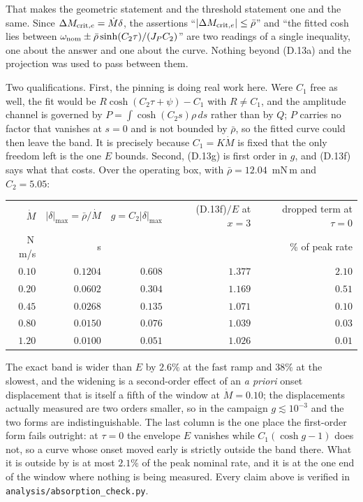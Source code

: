 \documentclass[11pt]{article}
\newcommand{\rbar}{\bar\rho}
\begin{document}
That makes the geometric statement and the threshold statement one and
the same. Since $\Delta M_{{\rm crit},e} = \dot M\delta$, the assertions
``$|\Delta M_{{\rm crit},e}| \le \rbar$'' and ``the fitted cosh lies
between $\omega_{\rm nom} \pm \rbar\sinh(C_2\tau)/(J_PC_2)$'' are two
readings of a single inequality, one about the answer and one about the
curve. Nothing beyond (D.13a) and the projection was used to pass
between them.

Two qualifications. First, the pinning is doing real work here. Were
$C_1$ free as well, the fit would be $R\cosh(C_2\tau+\psi) - C_1$ with
$R\neq C_1$, and the amplitude channel is governed by
$P = \int\cosh(C_2s)\rho\,ds$ rather than by $Q$; $P$ carries no factor
that vanishes at $s = 0$ and is not bounded by $\rbar$, so the fitted
curve could then leave the band. It is precisely because
$C_1 = K\dot M$ is fixed that the only freedom left is the one $E$
bounds. Second, (D.13g) is first order in $g$, and (D.13f) says what
that costs. Over the operating box, with $\rbar = 12.04$~mN\,m and
$C_2 = 5.05$:

\begin{center}\small
\begin{tabular}{@{}rrrrr@{}}
\toprule
$\dot M$ & $|\delta|_{\max} = \rbar/\dot M$ & $g = C_2|\delta|_{\max}$
 & (D.13f)$/E$ at $x=3$ & dropped term at $\tau=0$ \\
N\,m/s & s & & & \% of peak rate \\
\midrule
$0.10$ & $0.1204$ & $0.608$ & $1.377$ & $2.10$ \\
$0.20$ & $0.0602$ & $0.304$ & $1.169$ & $0.51$ \\
$0.45$ & $0.0268$ & $0.135$ & $1.071$ & $0.10$ \\
$0.80$ & $0.0150$ & $0.076$ & $1.039$ & $0.03$ \\
$1.20$ & $0.0100$ & $0.051$ & $1.026$ & $0.01$ \\
\bottomrule
\end{tabular}
\end{center}

The exact band is wider than $E$ by $2.6\%$ at the fast ramp and $38\%$
at the slowest, and the widening is a second-order effect of an
\emph{a priori} onset displacement that is itself a fifth of the window
at $\dot M = 0.10$; the displacements actually measured are two orders
smaller, so in the campaign $g \lesssim 10^{-3}$ and the two forms are
indistinguishable. The last column is the one place the first-order
form fails outright: at $\tau = 0$ the envelope $E$ vanishes while
$C_1(\cosh g - 1)$ does not, so a curve whose onset moved early is
strictly outside the band there. What it is outside by is at most
$2.1\%$ of the peak nominal rate, and it is at the one end of the
window where nothing is being measured. Every claim above is verified
in \texttt{analysis/absorption\_check.py}.
\end{document}
